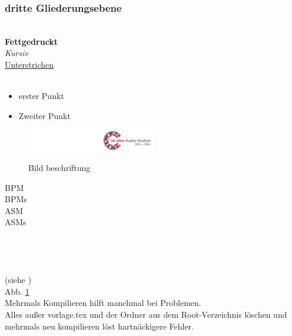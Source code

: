\subsubsection{dritte Gliederungsebene}		%
\label{referenzKey} 					   	%
 				\\ 	%
\textbf{Fettgedruckt}					\\ 	%
\textit{Kursiv}							\\ 	%
\underline{Unterstrichen}				\\ 	%
\\											%
\begin{itemize}								%
	\item erster Punkt						%
	\item Zweiter Punkt						%
\end{itemize}								%
\begin{figure}[hbt]							%
	\centering 								%
	\includegraphics[trim = 200mm 0mm 0mm 0mm, width=0.5\textwidth]{images/jubilaeum.jpg}
	\caption{Bild beschriftung} {\emph{}} %
	\label{jubilaeum}
\end{figure}
\gls{BPM} 								\\ 	%
\glspl{BPM} 							\\ 	%
\gls{ASM} 								\\ 	%
\glspl{ASM} 							\\ 	%
 							\\ 	%
 						\\ 	%
					\\ 	%
\cite{BiBkey} 							\\ 	%
(siehe )			\\ 	%
Abb. \ref{jubilaeum}					\\	%
Mehrmals Kompilieren hilft manchmal bei Problemen.\\
Alles außer vorlage.tex und der Ordner aus dem Root-Verzeichnis löschen und mehrmals neu kompilieren löst hartnäckigere Fehler.